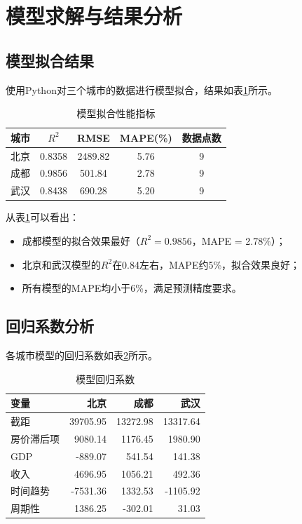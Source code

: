 \documentclass[12pt,a4paper]{article}
\begin{document}
\section{模型求解与结果分析}

\subsection{模型拟合结果}

使用Python对三个城市的数据进行模型拟合，结果如表\ref{tab:model_fit}所示。

\begin{table}[H]
\centering
\caption{模型拟合性能指标}
\label{tab:model_fit}
\begin{tabular}{lcccc}
\toprule
\textbf{城市} & \textbf{$R^2$} & \textbf{RMSE} & \textbf{MAPE(\%)} & \textbf{数据点数} \\
\midrule
北京 & 0.8358 & 2489.82 & 5.76 & 9 \\
成都 & 0.9856 & 501.84 & 2.78 & 9 \\
武汉 & 0.8438 & 690.28 & 5.20 & 9 \\
\bottomrule
\end{tabular}
\end{table}

从表\ref{tab:model_fit}可以看出：
\begin{itemize}
    \item 成都模型的拟合效果最好（$R^2 = 0.9856$，MAPE = 2.78\%）；
    \item 北京和武汉模型的$R^2$在0.84左右，MAPE约5\%，拟合效果良好；
    \item 所有模型的MAPE均小于6\%，满足预测精度要求。
\end{itemize}

\subsection{回归系数分析}

各城市模型的回归系数如表\ref{tab:coefficients}所示。

\begin{table}[H]
\centering
\caption{模型回归系数}
\label{tab:coefficients}
\begin{tabular}{lrrr}
\toprule
\textbf{变量} & \textbf{北京} & \textbf{成都} & \textbf{武汉} \\
\midrule
截距 & 39705.95 & 13272.98 & 13317.64 \\
房价滞后项 & 9080.14 & 1176.45 & 1980.90 \\
GDP & -889.07 & 541.54 & 141.38 \\
收入 & 4696.95 & 1056.21 & 492.36 \\
时间趋势 & -7531.36 & 1332.53 & -1105.92 \\
周期性 & 1386.25 & -302.01 & 31.03 \\
\bottomrule
\end{tabular}
\end{table}
\end{document}
